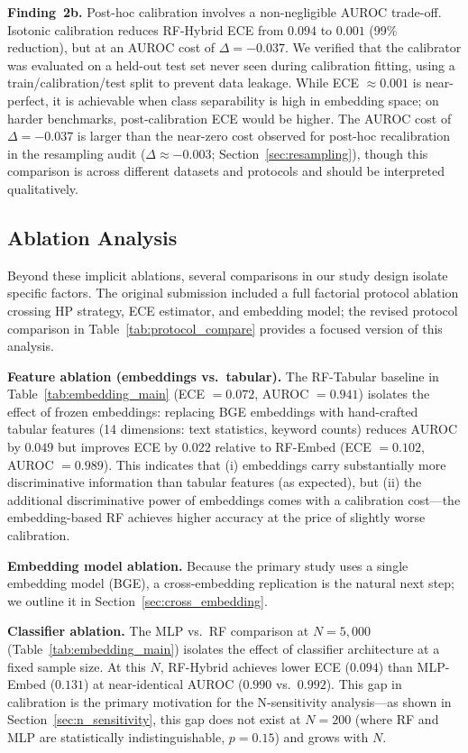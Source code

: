 \documentclass[11pt]{article}
\begin{document}
\textbf{Finding~2b.} Post-hoc calibration involves a non-negligible AUROC trade-off. Isotonic calibration reduces RF-Hybrid ECE from $0.094$ to $0.001$ (99\% reduction), but at an AUROC cost of $\Delta = -0.037$. We verified that the calibrator was evaluated on a held-out test set never seen during calibration fitting, using a train/calibration/test split to prevent data leakage. While ECE $\approx 0.001$ is near-perfect, it is achievable when class separability is high in embedding space; on harder benchmarks, post-calibration ECE would be higher. The AUROC cost of $\Delta = -0.037$ is larger than the near-zero cost observed for post-hoc recalibration in the resampling audit ($\Delta \approx -0.003$; Section~\ref{sec:resampling}), though this comparison is across different datasets and protocols and should be interpreted qualitatively.

\subsection{Ablation Analysis}

Beyond these implicit ablations, several comparisons in our study design isolate specific factors. The original submission included a full factorial protocol ablation crossing HP strategy, ECE estimator, and embedding model; the revised protocol comparison in Table~\ref{tab:protocol_compare} provides a focused version of this analysis.

\textbf{Feature ablation (embeddings vs.\ tabular).} The RF-Tabular baseline in Table~\ref{tab:embedding_main} (ECE $=0.072$, AUROC $=0.941$) isolates the effect of frozen embeddings: replacing BGE embeddings with hand-crafted tabular features (14 dimensions: text statistics, keyword counts) reduces AUROC by $0.049$ but improves ECE by $0.022$ relative to RF-Embed (ECE $=0.102$, AUROC $=0.989$). This indicates that (i) embeddings carry substantially more discriminative information than tabular features (as expected), but (ii) the additional discriminative power of embeddings comes with a calibration cost---the embedding-based RF achieves higher accuracy at the price of slightly worse calibration.

\textbf{Embedding model ablation.} Because the primary study uses a single embedding model (BGE), a cross-embedding replication is the natural next step; we outline it in Section~\ref{sec:cross_embedding}.

\textbf{Classifier ablation.} The MLP vs.\ RF comparison at $N=5{,}000$ (Table~\ref{tab:embedding_main}) isolates the effect of classifier architecture at a fixed sample size. At this $N$, RF-Hybrid achieves lower ECE ($0.094$) than MLP-Embed ($0.131$) at near-identical AUROC ($0.990$ vs.\ $0.992$). This gap in calibration is the primary motivation for the N-sensitivity analysis---as shown in Section~\ref{sec:n_sensitivity}, this gap does not exist at $N=200$ (where RF and MLP are statistically indistinguishable, $p=0.15$) and grows with $N$.
\end{document}

